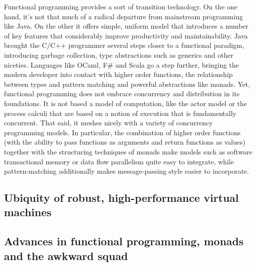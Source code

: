 Functional programming provides a sort of transition technology. On
the one hand, it's not that much of a radical departure from
mainstream programming like Java. On the other it offers simple,
uniform model that introduces a number of key features that
considerably improve productivity and maintainability. Java brought
the C/C++ programmer several steps closer to a functional paradigm,
introducing garbage collection, type abstractions such as generics and
other niceties. Languages like OCaml, F\# and Scala go a step further,
bringing the modern developer into contact with higher order
functions, the relationship between types and pattern matching and
powerful abstractions like monads. Yet, functional programming does
not embrace concurrency and distribution in its foundations. It is not
based a model of computation, like the actor model or the process
calculi that are based on a notion of execution that is fundamentally
concurrent. That said, it meshes nicely with a variety of concurrency
programming models. In particular, the combination of higher order
functions (with the ability to pass functions as arguments and return
functions as values) together with the structuring techniques of
monads make models such as software transactional memory or data flow
parallelism quite easy to integrate, while pattern-matching
additionally makes message-passing style easier to incorporate.

\subsection{Ubiquity of robust, high-performance virtual machines}



\subsection{Advances in functional programming, monads and the awkward squad}

